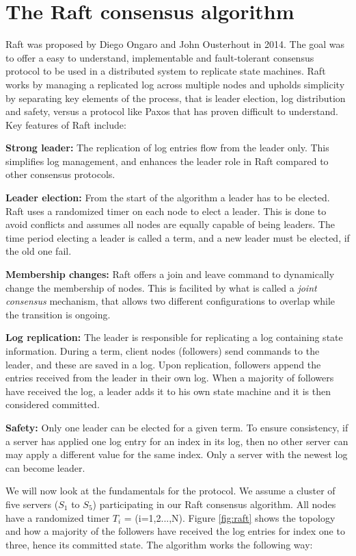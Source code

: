 \section{The Raft consensus algorithm}

Raft was proposed by Diego Ongaro and John Ousterhout in 2014. The goal was to offer a easy to understand, implementable and fault-tolerant consensus protocol to be used in a distributed system to replicate state machines. Raft works by managing a replicated log across multiple nodes and upholds simplicity by separating key elements of the process, that is leader election, log distribution and safety, versus a protocol like Paxos that has proven difficult to understand. Key features of Raft include:

\noindent \textbf{Strong leader:} The replication of log entries flow from the leader only. This simplifies log management, and enhances the leader role in Raft compared to other consensus protocols.

\noindent \textbf{Leader election:} From the start of the algorithm a leader has to be elected. Raft uses a randomized timer on each node to elect a leader. This is done to avoid conflicts and assumes all nodes are equally capable of being leaders. The time period electing a leader is called a term, and a new leader must be elected, if the old one fail.

\noindent \textbf{Membership changes:} Raft offers a join and leave command to dynamically change the membership of nodes. This is facilited by what is called a \textit{joint consensus} mechanism, that allows two different configurations to overlap while the transition is ongoing.

\noindent \textbf{Log replication:} The leader is responsible for replicating a log containing state information. During a term, client nodes (followers) send commands to the leader, and these are saved in a log. Upon replication, followers append the entries received from the leader in their own log. When a majority of followers have received the log, a leader adds it to his own state machine and it is then considered committed.

\noindent \textbf{Safety:} Only one leader can be elected for a given term. To ensure consistency, if a server has applied one log entry for an index in its log, then no other server can may apply a different value for the same index. Only a server with the newest log can become leader.

\noindent We will now look at the fundamentals for the protocol. We assume a cluster of five servers ($S_1$ to $S_5$) participating in our Raft consensus algorithm. All nodes have a randomized timer $T_i$ = (i=1,2...,N). Figure \ref{fig:raft} shows the topology and how a majority of the followers have received the log entries for index one to three, hence its committed state. The algorithm works the following way:

